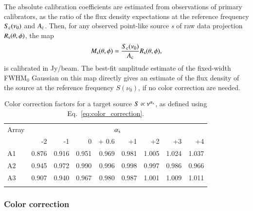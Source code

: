 The absolute calibration coefficients are estimated from observations
of primary calibrators, as the ratio of
the flux density expectations at the reference frequency
$S_{\rm{c}}(\nu_0)$ and $A_{\rm{c}}$. Then, for any observed point-like source
{\sl s} of raw data projection $R_{\rm{s}}(\theta,\phi)$, the map
\begin{equation}
  M_{\rm{s}}(\theta, \phi) = \frac{S_{\rm{c}} (\nu_{0})}{A_{\rm{c}}}
  R_{\rm{s}}(\theta,\phi),
  \label{eq:pointsourcephot}
\end{equation}
is calibrated in Jy/beam. {\lp The best-fit amplitude estimate
of the fixed-width FWHM$_{0}$ Gaussian on this map directly gives an
estimate of the flux density of the source at the reference
frequency $S(\nu_{0})$, if no color correction are needed.}

\begin{table}[!thbp]
\caption{Color correction factors for a target source  $S \propto \nu^{\alpha_{\rm{s}}}$, as defined using Eq.~\ref{eq:color_correction}.}
\label{tab:mod}
\centering 
\begin{tabular}{lrrrrrrrr}
\hline\hline
\noalign{\smallskip}
Array     & \multicolumn{8}{c}{$\alpha_{\rm{s}}$} \\
\noalign{\smallskip}
\hline
\noalign{\smallskip}
         &  -2 &  -1    &    0  & + 0.6 & +1  &  +2  & +3 & +4  \\       
\noalign{\smallskip}
\hline
\noalign{\smallskip}
          A1   & 0.876  &  0.916   &   0.951  & 0.969 &  0.981   &  1.005  &    1.024  &  1.037   \\
          A2   & 0.945  &  0.972   &   0.990  & 0.996 &  0.998   &  0.997  &    0.986  &  0.966      \\ 
          A3   & 0.907  &  0.940   &   0.967  & 0.980 &  0.987   &  1.001  &    1.009  &  1.011     \\
            \noalign{\smallskip}
            \hline
\end{tabular}
\end{table}

\subsubsection{Color correction}

